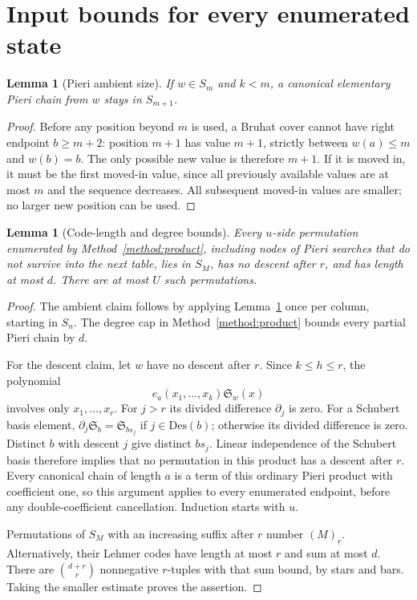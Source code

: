 \documentclass{amsart}
\newtheorem{lemma}[theorem]{Lemma}
\theoremstyle{definition}
\theoremstyle{remark}
\numberwithin{equation}{section}
\newcommand{\Sch}{\mathfrak S}
\newcommand{\Des}{\mathrm{Des}}
\newcommand{\fall}[2]{(#1)_{\underline{#2}}}
\begin{document}
\section{Input bounds for every enumerated state}\label{sec:states}

\begin{lemma}[Pieri ambient size]\label{lem:ambient}
If $w\in S_m$ and $k<m$, a canonical elementary Pieri chain from
$w$ stays in $S_{m+1}$.
\end{lemma}
\begin{proof}
Before any position beyond $m$ is used, a Bruhat cover cannot have
right endpoint $b\geq m+2$: position $m+1$ has value $m+1$,
strictly between $w(a)\leq m$ and $w(b)=b$.
The only possible new value is therefore $m+1$.
If it is moved in, it must be the first moved-in value, since all
previously available values are at most $m$ and the sequence decreases.
All subsequent moved-in values are smaller; no larger new position
can be used.
\end{proof}

\begin{lemma}[Code-length and degree bounds]\label{lem:states}
Every $u$-side permutation enumerated by Method~\ref{method:product},
including nodes of Pieri searches that do not survive into the next
table, lies in $S_M$, has no descent after $r$, and has length at most $d$.
There are at most $U$ such permutations.
\end{lemma}
\begin{proof}
The ambient claim follows by applying Lemma~\ref{lem:ambient} once
per column, starting in $S_n$.
The degree cap in Method~\ref{method:product} bounds every partial
Pieri chain by $d$.

For the descent claim, let $w$ have no descent after $r$.
Since $k\leq h\leq r$, the polynomial
\[
 e_a(x_1,\ldots,x_k)\Sch_w(x)
\]
involves only $x_1,\ldots,x_r$.
For $j>r$ its divided difference $\partial_j$ is zero.
For a Schubert basis element, $\partial_j\Sch_b=\Sch_{bs_j}$
if $j\in\Des(b)$; otherwise its divided difference is zero.
Distinct $b$ with descent $j$ give distinct $bs_j$.
Linear independence of the Schubert basis therefore implies that no
permutation in this product has a descent after $r$.
Every canonical chain of length $a$ is a term of this ordinary Pieri
product with coefficient one, so this argument applies to
every enumerated endpoint, before any double-coefficient cancellation.
Induction starts with $u$.

Permutations of $S_M$ with an increasing suffix after $r$ number
$\fall{M}{r}$.
Alternatively, their Lehmer codes have length at most $r$ and sum
at most $d$. There are $\binom{d+r}{r}$ nonnegative $r$-tuples with
that sum bound, by stars and bars.
Taking the smaller estimate proves the assertion.
\end{proof}
\end{document}
